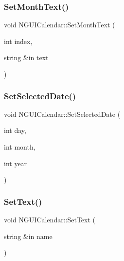 \hypertarget{class_n_g_u_i_calendar_afce282f046e5fb08bdb6986ad409501d}{}\label{class_n_g_u_i_calendar_afce282f046e5fb08bdb6986ad409501d} 
\subsubsection{\texorpdfstring{Set\+Month\+Text()}{SetMonthText()}}
{\footnotesize\ttfamily void N\+G\+U\+I\+Calendar\+::\+Set\+Month\+Text (\begin{DoxyParamCaption}\item[{int}]{index,  }\item[{string \&in}]{text }\end{DoxyParamCaption})}

\hypertarget{class_n_g_u_i_calendar_ab2238e8a500b9de87b67e8d5a05518c0}{}\label{class_n_g_u_i_calendar_ab2238e8a500b9de87b67e8d5a05518c0} 
\subsubsection{\texorpdfstring{Set\+Selected\+Date()}{SetSelectedDate()}}
{\footnotesize\ttfamily void N\+G\+U\+I\+Calendar\+::\+Set\+Selected\+Date (\begin{DoxyParamCaption}\item[{int}]{day,  }\item[{int}]{month,  }\item[{int}]{year }\end{DoxyParamCaption})}

\hypertarget{class_n_g_u_i_calendar_a0bc6fdb288ca331c507184183d712c51}{}\label{class_n_g_u_i_calendar_a0bc6fdb288ca331c507184183d712c51} 
\subsubsection{\texorpdfstring{Set\+Text()}{SetText()}}
{\footnotesize\ttfamily void N\+G\+U\+I\+Calendar\+::\+Set\+Text (\begin{DoxyParamCaption}\item[{string \&in}]{name }\end{DoxyParamCaption})}

